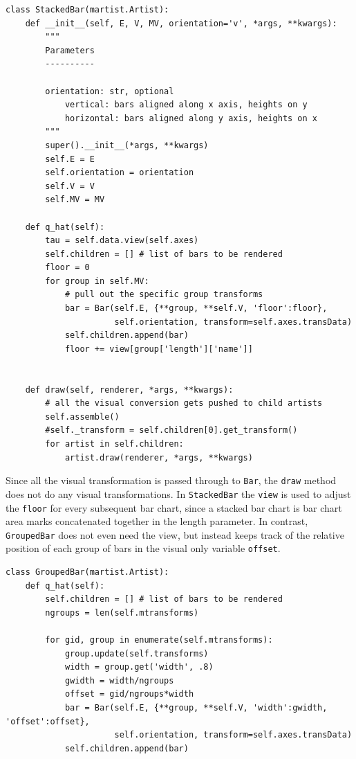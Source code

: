 \documentclass[../main.tex]{subfiles}
\begin{document}
\begin{verbatim}
class StackedBar(martist.Artist):
    def __init__(self, E, V, MV, orientation='v', *args, **kwargs):
        """
        Parameters
        ----------
   
        orientation: str, optional
            vertical: bars aligned along x axis, heights on y
            horizontal: bars aligned along y axis, heights on x   
        """
        super().__init__(*args, **kwargs)
        self.E = E
        self.orientation = orientation
        self.V = V
        self.MV = MV

    def q_hat(self):
        tau = self.data.view(self.axes)
        self.children = [] # list of bars to be rendered
        floor = 0
        for group in self.MV:
            # pull out the specific group transforms
            bar = Bar(self.E, {**group, **self.V, 'floor':floor}, 
                      self.orientation, transform=self.axes.transData)
            self.children.append(bar)
            floor += view[group['length']['name']]
            
            
    def draw(self, renderer, *args, **kwargs):
        # all the visual conversion gets pushed to child artists
        self.assemble()
        #self._transform = self.children[0].get_transform()
        for artist in self.children:
            artist.draw(renderer, *args, **kwargs)

\end{verbatim}

Since all the visual transformation is passed through to \texttt{Bar}, the \texttt{draw} method does not do any visual transformations. In \texttt{StackedBar} the \texttt{view} is used to adjust the \texttt{floor} for every subsequent bar chart, since a stacked bar chart is bar chart area marks concatenated together in the length parameter. In contrast, \texttt{GroupedBar} does not even need the view, but instead keeps track of the relative position of each group of bars in the visual only variable \texttt{offset}. 

\begin{verbatim}
class GroupedBar(martist.Artist):
    def q_hat(self):
        self.children = [] # list of bars to be rendered
        ngroups = len(self.mtransforms)
        
        for gid, group in enumerate(self.mtransforms):
            group.update(self.transforms)
            width = group.get('width', .8)
            gwidth = width/ngroups
            offset = gid/ngroups*width 
            bar = Bar(self.E, {**group, **self.V, 'width':gwidth, 'offset':offset}, 
                      self.orientation, transform=self.axes.transData)     
            self.children.append(bar)
\end{verbatim}
\end{document}
